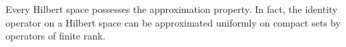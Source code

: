 Every Hilbert space possesses the approximation property. In fact, the identity operator on a Hilbert space can be approximated uniformly on compact sets by operators of finite rank.
